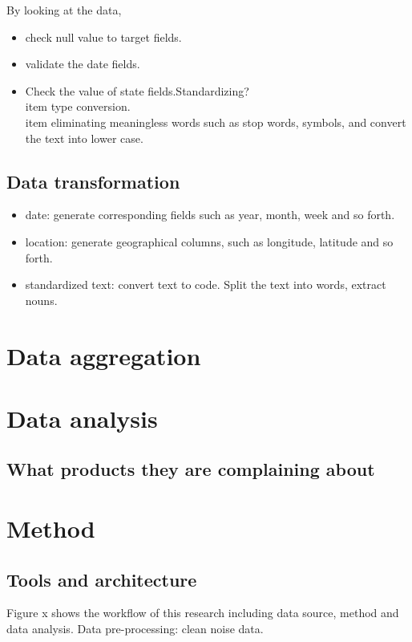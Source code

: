 \documentclass[conference]{IEEEtran}
\begin{document}
By looking at the data, 
\begin{itemize}
\item check null value to target fields.
\item validate the date fields.
\item Check the value of state fields.Standardizing?
\\item type conversion.
\\item eliminating meaningless words such as stop words, symbols, and convert the text into lower case.
\end{itemize}



\subsection{Data transformation}\label{AA}
\begin{itemize}

\item date: generate corresponding fields such as year, month, week and so forth.
\item location: generate geographical columns, such as longitude, latitude and so forth.
\item standardized text: convert text to code. Split the text into words, extract nouns.
\end{itemize}


\section{Data aggregation}\label{AA}

\section{Data analysis}\label{AA}
\subsection{What products they are complaining about}\label{AA}


\section{Method}

\subsection{Tools and architecture }\label{AA}
Figure x shows the workflow of this research including data source, method and data analysis.
Data pre-processing: clean noise data.
\end{document}
